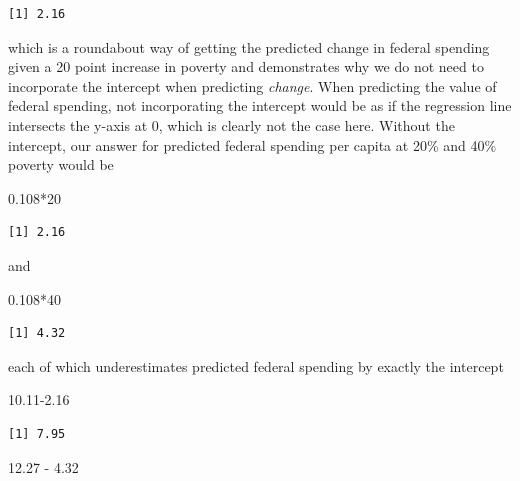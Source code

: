 \documentclass[
]{book}
\makeatletter
\newenvironment{Shaded}{\begin{snugshade}}{\end{snugshade}}
\newcommand{\DecValTok}[1]{\textcolor[rgb]{0.06,0.06,0.06}{#1}}
\newcommand{\FloatTok}[1]{\textcolor[rgb]{0.06,0.06,0.06}{#1}}
\newcommand{\SpecialCharTok}[1]{\textcolor[rgb]{0,0,0}{#1}}
\newenvironment{kframe}{%
\medskip{}
\setlength{\fboxsep}{.8em}
 \def\at@end@of@kframe{}%
 \ifinner\ifhmode%
  \def\at@end@of@kframe{\end{minipage}}%
  \begin{minipage}{\columnwidth}%
 \fi\fi%
 \def\FrameCommand##1{\hskip\@totalleftmargin \hskip-\fboxsep
 \colorbox{shadecolor}{##1}\hskip-\fboxsep
     \hskip-\linewidth \hskip-\@totalleftmargin \hskip\columnwidth}%
 \MakeFramed {\advance\hsize-\width
   \@totalleftmargin\z@ \linewidth\hsize
   \@setminipage}}%
 {\par\unskip\endMakeFramed%
 \at@end@of@kframe}
\renewenvironment{Shaded}{\begin{kframe}}{\end{kframe}}
\makeatother
\begin{document}
\begin{verbatim}
[1] 2.16
\end{verbatim}

which is a roundabout way of getting the predicted change in federal spending given a 20 point increase in poverty and demonstrates why we do not need to incorporate the intercept when predicting \emph{change}. When predicting the value of federal spending, not incorporating the intercept would be as if the regression line intersects the y-axis at 0, which is clearly not the case here. Without the intercept, our answer for predicted federal spending per capita at 20\% and 40\% poverty would be

\begin{Shaded}
\begin{Highlighting}[]
\FloatTok{0.108}\SpecialCharTok{*}\DecValTok{20}
\end{Highlighting}
\end{Shaded}

\begin{verbatim}
[1] 2.16
\end{verbatim}

and

\begin{Shaded}
\begin{Highlighting}[]
\FloatTok{0.108}\SpecialCharTok{*}\DecValTok{40}
\end{Highlighting}
\end{Shaded}

\begin{verbatim}
[1] 4.32
\end{verbatim}

each of which underestimates predicted federal spending by exactly the intercept

\begin{Shaded}
\begin{Highlighting}[]
\FloatTok{10.11{-}2.16}
\end{Highlighting}
\end{Shaded}

\begin{verbatim}
[1] 7.95
\end{verbatim}

\begin{Shaded}
\begin{Highlighting}[]
\FloatTok{12.27} \SpecialCharTok{{-}} \FloatTok{4.32}
\end{Highlighting}
\end{Shaded}
\end{document}
